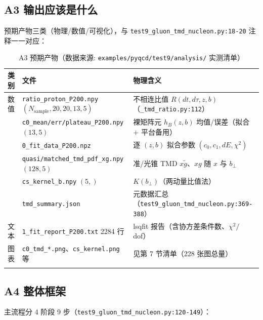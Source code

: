 \documentclass[UTF8]{ctexart}
\begin{document}
\subsection{A3 输出应该是什么}
\label{sec:a3}
预期产物三类（物理/数值/可视化），与 \texttt{\nolinkurl{test9\_gluon\_tmd\_nucleon.py:18-20}} 注释一一对应：

\tiny
\begin{xltabular}{\textwidth}{llX}
\toprule
类别 & 文件 & 物理含义 \\
\midrule
\endhead
数值 & \texttt{\nolinkurl{ratio\_proton\_P200.npy}} $(N_{\text{sample}},20,20,13,5)$ & 不相连比值 $R(dt,d\tau,z,b)$（\texttt{\nolinkurl{\_tmd\_ratio.py:112}}）\\
 & \texttt{\nolinkurl{c0\_mean/err/plateau\_P200.npy}} $(13,5)$ & 裸矩阵元 $h_B(z,b)$ 均值/误差（拟合 $+$ 平台备用）\\
 & \texttt{\nolinkurl{0\_fit\_data\_P200.npz}} & 逐 $(z,b)$ 拟合参数 $(c_0,c_1,dE,\chi^2)$\\
 & \texttt{\nolinkurl{quasi/matched\_tmd\_pdf\_xg.npy}} $(128,5)$ & 准/光锥 TMD $x\tilde g$、$xg$ 随 $x$ 与 $b_\perp$\\
 & \texttt{\nolinkurl{cs\_kernel\_b.npy}} $(5,)$ & $K(b_\perp)$（两动量比值法）\\
 & \texttt{\nolinkurl{tmd\_summary.json}} & 元数据汇总（\texttt{\nolinkurl{test9\_gluon\_tmd\_nucleon.py:369-388}}）\\
文本 & \texttt{\nolinkurl{1\_fit\_report\_P200.txt}} 2284 行 & lsqfit 报告（含协方差条件数、$\chi^2/$dof）\\
图表 & \texttt{\nolinkurl{c0\_tmd\_*.png}}、\texttt{\nolinkurl{cs\_kernel.png}} 等 & 见第 7 节清单（228 张图总量）\\
\bottomrule
\caption{A3 预期产物（数据来源: \texttt{\nolinkurl{examples/pyqcd/test9/analysis/}} 实测清单）}
\end{xltabular}

\subsection{A4 整体框架}
\label{sec:a4}
主流程分 4 阶段 9 步（\texttt{\nolinkurl{test9\_gluon\_tmd\_nucleon.py:120-149}}）：
\end{document}
